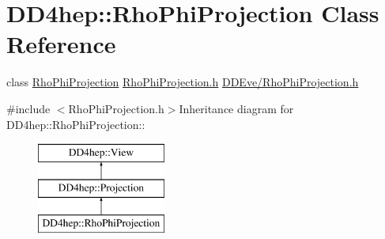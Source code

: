 \hypertarget{class_d_d4hep_1_1_rho_phi_projection}{
\section{DD4hep::RhoPhiProjection Class Reference}
\label{class_d_d4hep_1_1_rho_phi_projection}
}


class \hyperlink{class_d_d4hep_1_1_rho_phi_projection}{RhoPhiProjection} \hyperlink{_rho_phi_projection_8h}{RhoPhiProjection.h} \hyperlink{_rho_phi_projection_8h}{DDEve/RhoPhiProjection.h}  


{\ttfamily \#include $<$RhoPhiProjection.h$>$}Inheritance diagram for DD4hep::RhoPhiProjection::\begin{figure}[H]
\begin{center}
\leavevmode
\includegraphics[height=3cm]{class_d_d4hep_1_1_rho_phi_projection}
\end{center}
\end{figure}
